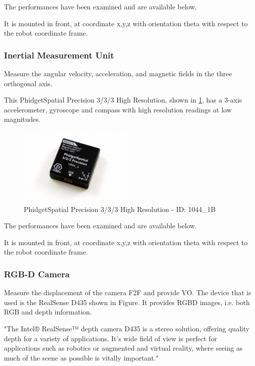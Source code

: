 The performances have been examined and are available below.


It is mounted in front, at coordinate x,y,z with orientation theta with respect to the robot coordinate frame.

\subsubsection{Inertial Measurement Unit}

\noindent Measure the angular velocity, acceleration, and magnetic fields in the three orthogonal axis.

This PhidgetSpatial Precision 3/3/3 High Resolution, shown in \ref{fig:spatial}, has a 3-axis accelerometer, gyroscope and compass with high resolution readings at low magnitudes.

\begin{figure}[!ht]
	\begin{center}
		\includegraphics[width=0.5\textwidth]{Images/4-Methods/1044_1B.jpg}
	\end{center}
	\caption{PhidgetSpatial Precision 3/3/3 High Resolution - ID: 1044\_1B}
	\label{fig:spatial}
\end{figure}


The performances have been examined and are available below.

It is mounted in front, at coordinate x,y,z with orientation theta with respect to the robot coordinate frame.

\subsubsection{RGB-D Camera}

\noindent Measure the displacement of the camera \gls{F2F} and provide \gls{VO}.
The device that is used is the RealSense D435 shown in Figure.
It provides \gls{RGBD} images, i.e. both \gls{RGB} and depth information.

"The Intel® RealSense™ depth camera D435 is a stereo solution, offering quality depth for a variety of applications. It's wide field of view is perfect for applications such as robotics or augmented and virtual reality, where seeing as much of the scene as possible is vitally important."


